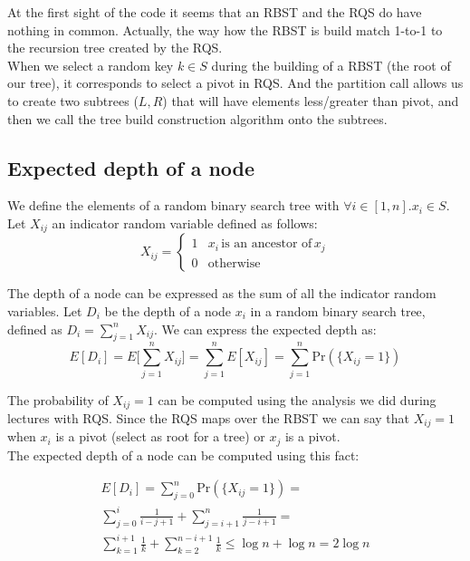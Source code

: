 \documentclass{article}
\begin{document}
\noindent At the first sight of the code it seems that an RBST and the RQS do have nothing in common. Actually,
the way how the RBST is build match 1-to-1 to the recursion tree created by the RQS.\\

\noindent When we select a random key $k \in S$ during the building of a RBST (the root of our tree), it corresponds to select a pivot 
in RQS. And the partition call allows us to create two subtrees ($L, R$) that will have elements less/greater than pivot,
and then we call the tree build construction algorithm onto the subtrees.\\ 

\subsection{Expected depth of a node}

We define the elements of a random binary search tree with $\forall i \in [1, n] . x_i \in S$. Let $X_{ij}$ an indicator random variable defined as follows:
\begin{equation}
    X_{ij} = \begin{cases}
    1 & x_i \, \textrm{is an ancestor of} \, x_j\\
    0 & \textrm{otherwise}
    \end{cases}
\end{equation}

\noindent The depth of a node can be expressed as the sum of all the indicator random variables. Let $D_i$ be the depth of a node $x_i$ in a random binary search tree, defined as $D_i = \sum_{j = 1}^{n} X_{ij}$. We can express the expected depth as:
\begin{equation}
E[D_i] = E\bigg[\sum_{j = 1}^{n} X_{ij}\bigg] = \sum_{j = 1}^{n} E[X_{ij}] = \sum_{j = 1}^{n} \textrm{Pr}(\{X_{ij} = 1\})
\end{equation}

\noindent The probability of $X_{ij} = 1$ can be computed using the analysis we did during lectures with RQS. Since the RQS maps
over the RBST we can say that $X_{ij} = 1$ when $x_i$ is a pivot (select as root for a tree) or $x_j$ is a pivot.\\

\noindent The expected depth of a node can be computed using this fact:

\begin{align*}
    E[D_i] = \sum_{j = 0}^{n} \textrm{Pr}(\{X_{ij} = 1\}) = \\ 
    \sum_{j = 0}^{i} \frac{1}{i - j + 1} + \sum_{j = i + 1}^{n} \frac{1}{j - i + 1} = \\
    \sum_{k = 1}^{i + 1} \frac{1}{k} + \sum_{k = 2}^{n - i + 1} \frac{1}{k} \le 
    \log{n} + \log{n} = 2 \log{n}
\end{align*}
\end{document}
